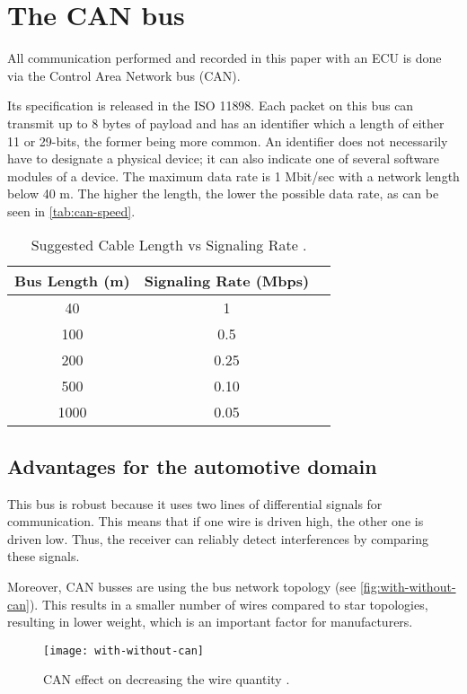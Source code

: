 \section{The CAN bus}

All communication performed and recorded in this paper with an ECU is done via the Control Area Network bus (CAN).

 Its specification is released in the ISO 11898. Each packet on this bus can transmit up to 8 bytes of payload and has an identifier which a length of either 11 or 29-bits, the former being more common. An identifier does not necessarily have to designate a physical device; it can also indicate one of several software modules of a device.
 The maximum data rate is 1 Mbit/sec with a network length below 40 m. The higher the length, the lower the possible data rate, as can be seen in \autoref{tab:can-speed}.

\begin{table}[htb]
    \centering
    \begin{tabular}{ccc}
    \hline
    \textbf{Bus Length (m)} & \textbf{Signaling Rate (Mbps)}\\
    \hline
    40 & 1 \\
    100 & 0.5 \\
    200 & 0.25 \\
    500 & 0.10 \\
    1000 & 0.05 \\
    \hline
\end{tabular}
\caption{Suggested Cable Length vs Signaling Rate \cite{slla270}.}
\label{tab:can-speed}
\end{table}

\subsection{Advantages for the automotive domain}

This bus is robust because it uses two lines of differential signals for communication. This means that if one wire is driven high, the other one is driven low. Thus, the receiver can reliably detect interferences by comparing these signals.

Moreover, CAN busses are using the bus network topology (see \autoref{fig:with-without-can}). This results in a smaller number of wires compared to star topologies, resulting in lower weight, which is an important factor for manufacturers.

\begin{figure}[htb]
    \centering
    \texttt{[image: with-without-can]}
    \caption{CAN effect on decreasing the wire quantity \cite{Sharma2016}.}
    \label{fig:with-without-can}
\end{figure}

